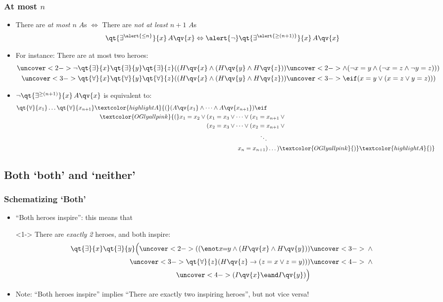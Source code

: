\begin{frame}
    \frametitle{At most $n$}

\begin{itemize}
\item<1-> There are \emph{at most $n$} $A$s $\Leftrightarrow$ There are
\emph{not at least $n+1$} $A$s
\[
\qt{\exists^{\alert{\le n}}}{x}\, A\qv{x} \Leftrightarrow \alert{\lnot} \qt{\exists^{\alert{\ge(n+1)}}}{x} \, A\qv{x}
\]
\item<2-> For instance: There are at most two heroes:
\begin{align*}
\uncover<2->{\lnot \qt{\exists}{x}\qt{\exists}{y}\qt{\exists}{z}((H\qv{x} \land (H\qv{y} \land H\qv{z}))}
& \uncover<2->{\land (\lnot x =y \land (\lnot x = z \land \lnot y = z)) )}\\
\uncover<3->{\qt{\forall}{x}\qt{\forall}{y}\qt{\forall}{z}((H\qv{x} \land (H\qv{y} \land H\qv{z}))
} &\uncover<3->{\eif (x =y \lor ( x = z \lor y = z)) )}
\end{align*}
\item<4-> $\lnot \qt{\exists^{\ge(n+1)}}{x} \, A\qv{x}$ is equivalent to:
\begin{align*}
\qt{\forall}{x_1}\dots\qt{\forall}{x_{n+1}} \textcolor{highlightA}{(}(A\qv{x_1} \land \dots \land A\qv{x_{n+1}}) \eif \qquad \\
\textcolor{OGlyallpink}{(}x_1 = x_2 \lor (x_1 = x_3 \lor \dots \lor (x_1 = x_{n+1} & {} \lor {}\\
(x_2 = x_3 \lor \dots \lor (x_2 = x_{n+1} & {} \lor {}\\
\ddots\qquad &\\
x_n = x_{n+1})\dots) & \textcolor{OGlyallpink}{)}\textcolor{highlightA}{)}
\end{align*}
\end{itemize}
\end{frame}

\subsection{Both `both' and `neither'}

\begin{frame}
    \frametitle{Schematizing `Both'}

\begin{itemize}
\item<1-> ``Both heroes inspire'': this means that 
\item[]<1-> There are \emph{exactly 2} heroes, and both inspire:
\begin{align*}
\qt{\exists}{x}\qt{\exists}{y}\Big(\uncover<2->{((\enot x\!\!=\!\!y \land (H\qv{x} \land H\qv{y}))} & 
\uncover<3->{{} \land {}}\\
\uncover<3->{\qt{\forall}{z}(H\qv{z} \to (z = x \lor z = y)))} & \uncover<4->{{}\land {}}\\
\uncover<4->{(I\qv{x} \eand I\qv{y})\Big)}&
\end{align*}
\item<5-> Note: ``Both heroes inspire'' implies ``There are exactly two inspiring heroes'', but not vice versa!
\end{itemize}
\end{frame}

